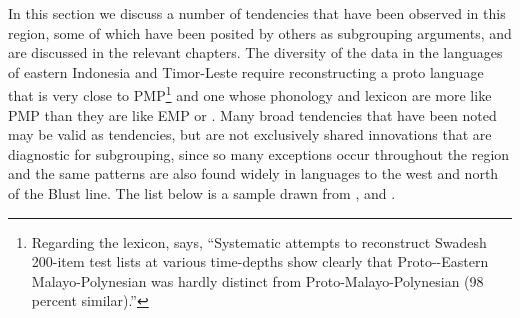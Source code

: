In this section we discuss a number of tendencies that have been observed in this region,
some of which have been posited by others as subgrouping arguments,
and are discussed in the relevant chapters.
The diversity of the data in the  languages of eastern Indonesia
and Timor-Leste require reconstructing a proto language that is very close to PMP\footnote{
		Regarding the lexicon,
		\citet[245]{Blust1993} says,
		“Systematic attempts to reconstruct Swadesh 200-item test lists at
		various time-depths show clearly that Proto--Eastern Malayo-Polynesian
		was hardly distinct from Proto-Malayo-Polynesian (98 percent similar).”}
and one whose phonology
and lexicon are more like PMP than they are like EMP or .
 Many broad tendencies that have been noted may be valid as tendencies,
but are not exclusively shared innovations that are diagnostic for subgrouping,
since so many exceptions occur throughout the region
and the same patterns are also found widely in languages to the west
and north of the Blust line.
The list below is a sample drawn from
\citet{Blust1993,Blust2013,DonohueGrimes2008,GrimesCIP}, and \citet{Schapper2015}.

